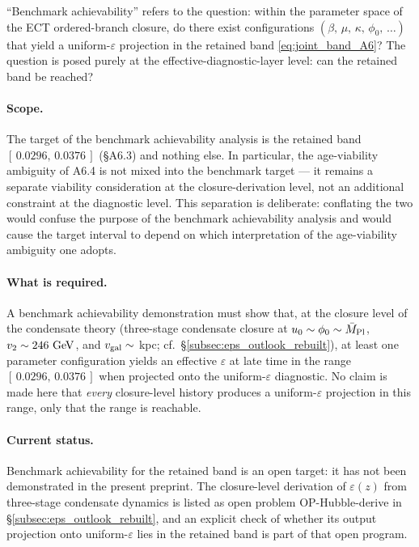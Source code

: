 ``Benchmark achievability'' refers to the question: within the
parameter space of the ECT ordered-branch closure, do there
exist configurations $(\beta,\,\mu,\,\kappa,\,\phi_0,\,\ldots)$
that yield a uniform-$\varepsilon$ projection in the retained
band \eqref{eq:joint_band_A6}? The question is posed purely at
the effective-diagnostic-layer level: can the retained band be
reached?

\paragraph{Scope.}
The target of the benchmark achievability analysis is the
retained band $[\,0.0296,\,0.0376\,]$ (\S A6.3) and nothing else.
In particular, the age-viability ambiguity of A6.4 is not mixed
into the benchmark target --- it remains a separate viability
consideration at the closure-derivation level, not an additional
constraint at the diagnostic level. This separation is
deliberate: conflating the two would confuse the purpose of the
benchmark achievability analysis and would cause the target
interval to depend on which interpretation of the age-viability
ambiguity one adopts.

\paragraph{What is required.}
A benchmark achievability demonstration must show that, at the
closure level of the condensate theory
(three-stage condensate closure at
$u_0 \sim \phi_0 \sim \bar{M}_{\rm Pl}$,
$v_2 \sim 246~{\rm GeV}$, and $v_{\rm gal} \sim$ kpc; cf.\
\S\ref{subsec:eps_outlook_rebuilt}), at least one parameter
configuration yields an effective $\varepsilon$ at late time in
the range $[\,0.0296,\,0.0376\,]$ when projected onto the
uniform-$\varepsilon$ diagnostic. No claim is made here that
\emph{every} closure-level history produces a uniform-$\varepsilon$
projection in this range, only that the range is reachable.

\paragraph{Current status.}
Benchmark achievability for the retained band is an open target:
it has not been demonstrated in the present preprint. The
closure-level derivation of $\varepsilon(z)$ from three-stage
condensate dynamics is listed as open problem OP-Hubble-derive
in \S\ref{subsec:eps_outlook_rebuilt}, and an explicit check of
whether its output projection onto uniform-$\varepsilon$ lies in
the retained band is part of that open program.

